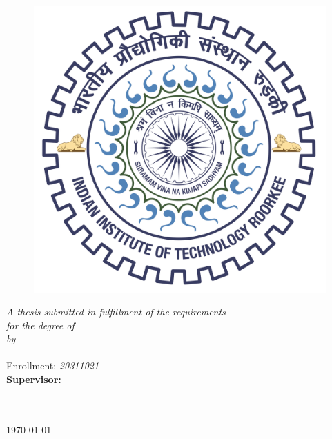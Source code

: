 \documentclass[11pt, a4paper, twoside]{Thesis} %
\begin{document}
\begin{titlepage}
\begin{center}

\HRule \\[0.4cm] %
{\huge \bfseries \ttitle}\\[0.4cm] %
\HRule \\[1cm] %

\graphicspath{ {./Figures/} }
\begin{figure}[hb]
  \centering
  \includegraphics[width=0.35\linewidth]{Pictures/logo_color.jpg}
\end{figure}



\large \textit{A thesis submitted in fulfillment of the requirements\\ for the degree of \degreename}\\[0.3cm] %
\textit{by}\\[0.4cm]
\textbf{\authornames}\\
Enrollment: \textit{20311021}\\[0.4cm] %

\textbf{Supervisor: }\supnameA\\



\vfill
\vfill 

\DEPTNAME\\ %
\textsc{ \UNIVNAME}\\[1.5cm] %
\large \today\\[2cm] %


\end{center}

\end{titlepage}


\end{document}
